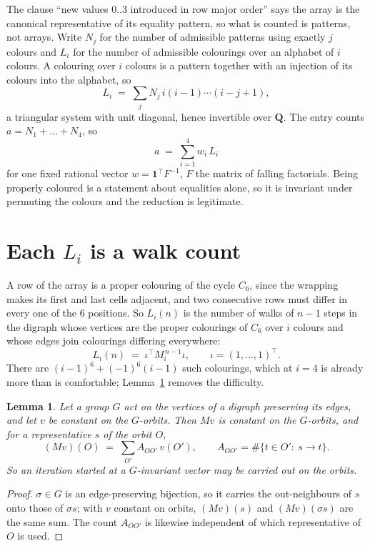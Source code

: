 \documentclass[11pt,a4paper]{article}
\theoremstyle{plain}
\newtheorem{lemma}[theorem]{Lemma}
\theoremstyle{definition}
\begin{document}
The clause ``new values $0..3$ introduced in row major order'' says the array is the
canonical representative of its equality pattern, so what is counted is patterns, not arrays.
Write $N_j$ for the number of admissible patterns using exactly $j$ colours and $L_i$ for the
number of admissible colourings over an alphabet of $i$ colours. A colouring over $i$ colours
is a pattern together with an injection of its colours into the alphabet, so
\[
L_i\;=\;\sum_j N_j\,i(i-1)\cdots(i-j+1),
\]
a triangular system with unit diagonal, hence invertible over $\mathbf{Q}$. The entry counts
$a=N_1+\dots+N_{4}$, so
\[
a\;=\;\sum_{i=1}^{4}w_i\,L_i
\]
for one fixed rational vector $w=\mathbf{1}^{\!\top}F^{-1}$, $F$ the matrix of falling
factorials. Being properly coloured is a statement about equalities alone, so it is invariant
under permuting the colours and the reduction is legitimate.

\section{Each $L_i$ is a walk count}

A row of the array is a proper colouring of the cycle $C_{6}$, since the wrapping makes
its first and last cells adjacent, and two consecutive rows must differ in every one of the
$6$ positions. So $L_i(n)$ is the number of walks of $n-1$ steps in the digraph whose
vertices are the proper colourings of $C_{6}$ over $i$ colours and whose edges join
colourings differing everywhere:
\[
L_i(n)\;=\;\iota^{\!\top}M_i^{\,n-1}\iota ,\qquad \iota=(1,\dots,1)^{\!\top} .
\]
There are $(i-1)^{6}+(-1)^{6}(i-1)$ such colourings, which at $i=4$ is already more
than is comfortable; Lemma~\ref{lem:lump} removes the difficulty.

\begin{lemma}\label{lem:lump}
Let a group $G$ act on the vertices of a digraph preserving its edges, and let $v$ be constant
on the $G$-orbits. Then $Mv$ is constant on the $G$-orbits, and for a representative $s$ of
the orbit $O$,
\[
(Mv)(O)\;=\;\sum_{O'}A_{OO'}\,v(O'),\qquad
A_{OO'}=\#\{t\in O':\ s\to t\} .
\]
So an iteration started at a $G$-invariant vector may be carried out on the orbits.
\end{lemma}

\begin{proof}
$\sigma\in G$ is an edge-preserving bijection, so it carries the out-neighbours of $s$ onto
those of $\sigma s$; with $v$ constant on orbits, $(Mv)(s)$ and $(Mv)(\sigma s)$ are the same
sum. The count $A_{OO'}$ is likewise independent of which representative of $O$ is used.
\end{proof}
\end{document}
